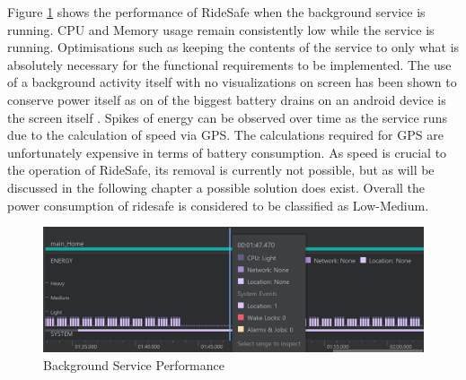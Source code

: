 Figure \ref{service} shows the performance of RideSafe when the background service is running. CPU and Memory usage remain consistently low while the service is running. Optimisations such as keeping the contents of the service to only what is absolutely necessary for the functional requirements to be implemented. The use of a background activity itself with no visualizations on screen has been shown to conserve power itself as on of the biggest battery drains on an android device is the screen itself \cite{power}.   Spikes of energy can be observed over time as the service runs due to the calculation of speed via GPS. The calculations required for GPS are unfortunately expensive in terms of battery consumption. As speed is crucial to the operation of RideSafe, its removal is currently not possible, but as will be discussed in the following chapter a possible solution does exist. Overall the power consumption of ridesafe is considered to be classified as Low-Medium.

\begin{figure}[h]
      \centering
      \includegraphics[scale = .8]{evaluation/service.png}
      \caption{Background Service Performance}
      \label{service}
\end{figure}
